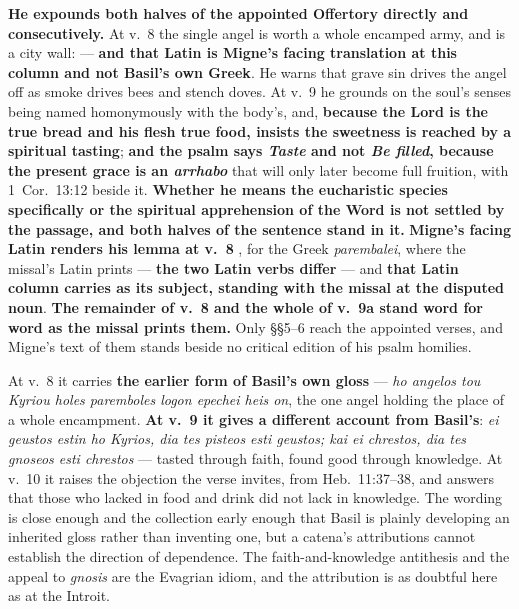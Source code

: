 \begin{witnessnote}
\textbf{He expounds both halves of the appointed Offertory directly and
consecutively.} At v.~8 the single angel is worth a whole encamped army, and
 is a city wall:  --- \textbf{and that
Latin is Migne's facing translation at this column and not Basil's own Greek}.
He warns that grave
sin drives the angel off as smoke drives bees and stench doves. At v.~9 he
grounds  on the soul's senses being named
homonymously with the body's, and, \textbf{because the Lord is the true bread
and his flesh true food, insists the sweetness is reached by a spiritual
tasting}; \textbf{and the psalm says \emph{Taste} and not \emph{Be filled},
because the present grace is an \emph{arrhabo}} that will only later become full
fruition, with 1~Cor.\ 13:12 beside it. \textbf{Whether he means the eucharistic
species specifically or the spiritual apprehension of the Word is not settled by
the passage, and both halves of the sentence stand in it.} \textbf{Migne's
facing Latin renders his lemma at v.~8 },
for the Greek \emph{parembalei}, where the missal's Latin prints
 --- \textbf{the two Latin verbs differ} ---
and \textbf{that Latin column carries  as its subject,
standing with the missal at the disputed noun}. \textbf{The remainder of v.~8
and the whole of v.~9a stand word for word as the missal prints them.}
Only §§5--6 reach the appointed
verses, and Migne's text of them stands beside no critical edition of his psalm
homilies.
\end{witnessnote}

\begin{witnessnote}
 At v.~8 it carries \textbf{the earlier form of Basil's own
gloss} --- \emph{ho angelos tou Kyriou holes paremboles logon epechei heis on},
the one angel holding the place of a whole encampment. \textbf{At v.~9 it gives
a different account from Basil's}: \emph{ei geustos estin ho Kyrios, dia tes
pisteos esti geustos; kai ei chrestos, dia tes gnoseos esti chrestos} --- tasted
through faith, found good through knowledge. At v.~10 it raises the objection
the verse invites, from Heb.\ 11:37--38, and answers that those who lacked in
food and drink did not lack in knowledge. The wording is close enough and the
collection early enough that Basil is plainly developing an inherited gloss
rather than inventing one, but a catena's attributions cannot establish the
direction of dependence. The
faith-and-knowledge antithesis and the appeal to \emph{gnosis} are the Evagrian
idiom, and the attribution is as doubtful here as at the Introit.
\end{witnessnote}

